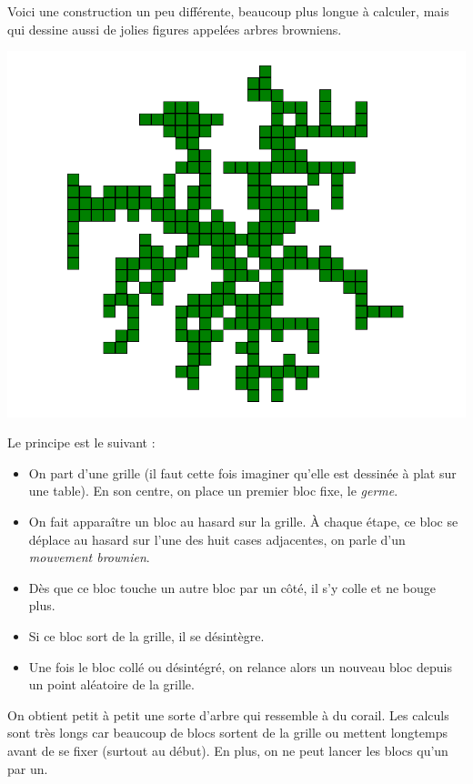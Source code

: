 \documentclass[11pt,class=report,crop=false]{standalone}
\begin{document}
\begin{cours}

Voici une construction un peu différente, beaucoup plus longue à calculer, mais qui dessine aussi de jolies figures appelées \og{}arbres browniens\fg{}.

\begin{center}
\includegraphics[scale=0.3]{ecran-alea-arbre1}
\end{center}


Le principe est le suivant :
\begin{itemize}
  \item On part d'une grille (il faut cette fois imaginer qu'elle est dessinée à plat sur une table). En son centre, on place un premier bloc fixe, le \emph{germe}.
  
  \item On fait apparaître un bloc au hasard sur la grille. À chaque étape, ce bloc se déplace au hasard sur l'une des huit cases adjacentes, on parle d'un \emph{mouvement brownien}. 

  \item Dès que ce bloc touche un autre bloc par un côté, il s'y colle et ne bouge plus.

  \item Si ce bloc sort de la grille, il se désintègre.
  
  \item Une fois le bloc collé ou désintégré, on relance alors un nouveau bloc depuis un point aléatoire de la grille.
\end{itemize}



On obtient petit à petit une sorte d'arbre qui ressemble à du corail. Les calculs sont très longs car beaucoup de blocs sortent de la grille ou mettent longtemps avant de se fixer (surtout au début). En plus, on ne peut lancer les blocs qu'un par un.

\end{cours}
\end{document}
